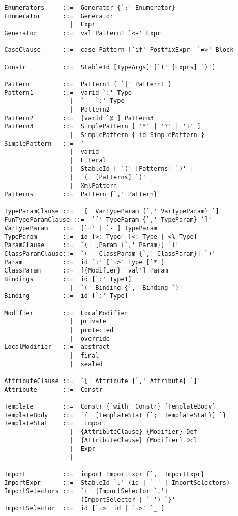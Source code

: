 \begin{lstlisting}
  Enumerators     ::=  Generator {`;' Enumerator}
  Enumerator      ::=  Generator
                    |  Expr
  Generator       ::=  val Pattern1 `<-' Expr

  CaseClause      ::=  case Pattern [`if' PostfixExpr] `=>' Block 

  Constr          ::=  StableId [TypeArgs] [`(' [Exprs] `)']  

  Pattern         ::=  Pattern1 { `|' Pattern1 }
  Pattern1        ::=  varid `:' Type
                    |  `_' `:' Type
                    |  Pattern2
  Pattern2        ::=  [varid `@'] Pattern3
  Pattern3        ::=  SimplePattern [ '*' | '?' | '+' ]
                    |  SimplePattern { id SimplePattern }
  SimplePattern   ::=  `_'
                    |  varid
                    |  Literal
                    |  StableId [ `(' [Patterns] `)' ]
                    |  `(' [Patterns] `)'
                    |  XmlPattern
  Patterns        ::=  Pattern {`,' Pattern}

  TypeParamClause ::=  `[' VarTypeParam {`,' VarTypeParam} `]'
  FunTypeParamClause ::=  `[' TypeParam {`,' TypeParam} `]'
  VarTypeParam    ::=  [`+' | `-'] TypeParam
  TypeParam       ::=  id [>: Type] [<: Type | <% Type]
  ParamClause     ::=  `(' [Param {`,' Param}] `)'
  ClassParamClause::=  `(' [ClassParam {`,' ClassParam}] `)'
  Param           ::=  id `:' [`=>' Type [`*']
  ClassParam      ::=  [{Modifier} `val'] Param
  Bindings        ::=  id [`:' Type1]
                    |  `(' Binding {`,' Binding `)'
  Binding         ::=  id [`:' Type]

  Modifier        ::=  LocalModifier
                    |  private
                    |  protected
                    |  override 
  LocalModifier   ::=  abstract
                    |  final
                    |  sealed

  AttributeClause ::=  `[' Attribute {`,' Attribute} `]'
  Attribute       ::=  Constr

  Template        ::=  Constr {`with' Constr} [TemplateBody]
  TemplateBody    ::=  `{' [TemplateStat {`;' TemplateStat}] `}'
  TemplateStat    ::=   Import
                    |  {AttributeClause} {Modifier} Def
                    |  {AttributeClause} {Modifier} Dcl
                    |  Expr
                    |

  Import          ::=  import ImportExpr {`,' ImportExpr}
  ImportExpr      ::=  StableId `.' (id | `_' | ImportSelectors)
  ImportSelectors ::=  `{' {ImportSelector `,'} 
                       (ImportSelector | `_') `}'
  ImportSelector  ::=  id [`=>' id | `=>' `_']


\end{lstlisting}
